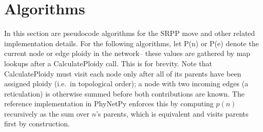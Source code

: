 \documentclass{article}
\begin{document}
\begin{table}[H]
    \centering
    
    \caption{Mean wall-clock runtime in seconds ($\pm$ s.d.) by scenario and
    method on the DEFJ benchmark.}
    \label{tab:defj-runtime}
\end{table}


\section{Algorithms} \label{Algs}
In this section are pseudocode algorithms for the SRPP move and other related implementation details. For the following algorithms, let P(n) or P(e) denote the current node or edge ploidy in the network-- these values are gathered by map lookups after a CalculatePloidy call. This is for brevity. Note that CalculatePloidy must visit each node only after all of its parents have been assigned ploidy (i.e.\ in topological order); a node with two incoming edges (a reticulation) is otherwise summed before both contributions are known. The reference implementation in PhyNetPy enforces this by computing $p(n)$ recursively as the sum over $n$'s parents, which is equivalent and visits parents first by construction.
\end{document}
